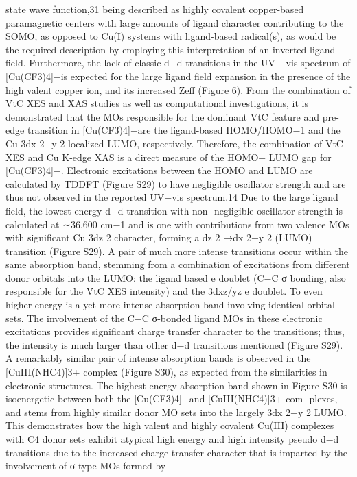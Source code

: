 \documentclass{article}
\begin{document}
state wave function,31 being described as highly covalent
copper-based paramagnetic centers with large amounts of
ligand character contributing to the SOMO, as opposed to
Cu(I) systems with ligand-based radical(s), as would be the
required description by employing this interpretation of an
inverted ligand ﬁeld.
Furthermore, the lack of classic d−d transitions in the UV−
vis spectrum of [Cu(CF3)4]−is expected for the large ligand
ﬁeld expansion in the presence of the high valent copper ion,
and its increased Zeff (Figure 6). From the combination of VtC
XES and XAS studies as well as computational investigations, it
is demonstrated that the MOs responsible for the dominant
VtC feature and pre-edge transition in [Cu(CF3)4]−are the
ligand-based HOMO/HOMO−1 and the Cu 3dx
2−y
2 localized
LUMO, respectively. Therefore, the combination of VtC XES
and Cu K-edge XAS is a direct measure of the HOMO−
LUMO gap for [Cu(CF3)4]−. Electronic excitations between
the HOMO and LUMO are calculated by TDDFT (Figure
S29) to have negligible oscillator strength and are thus not
observed in the reported UV−vis spectrum.14 Due to the large
ligand ﬁeld, the lowest energy d−d transition with non-
negligible oscillator strength is calculated at ∼36,600 cm−1 and
is one with contributions from two valence MOs with
signiﬁcant Cu 3dz
2 character, forming a dz
2 →dx
2−y
2
(LUMO) transition (Figure S29). A pair of much more
intense transitions occur within the same absorption band,
stemming from a combination of excitations from diﬀerent
donor orbitals into the LUMO: the ligand based e doublet
(C−C σ bonding, also responsible for the VtC XES intensity)
and the 3dxz/yz e doublet. To even higher energy is a yet more
intense absorption band involving identical orbital sets. The
involvement of the C−C σ-bonded ligand MOs in these
electronic excitations provides signiﬁcant charge transfer
character to the transitions; thus, the intensity is much larger
than other d−d transitions mentioned (Figure S29). A
remarkably similar pair of intense absorption bands is observed
in the [CuIII(NHC4)]3+ complex (Figure S30), as expected
from the similarities in electronic structures. The highest
energy absorption band shown in Figure S30 is isoenergetic
between both the [Cu(CF3)4]−and [CuIII(NHC4)]3+ com-
plexes, and stems from highly similar donor MO sets into the
largely 3dx
2−y
2 LUMO. This demonstrates how the high valent
and highly covalent Cu(III) complexes with C4 donor sets
exhibit atypical high energy and high intensity pseudo d−d
transitions due to the increased charge transfer character that is
imparted by the involvement of σ-type MOs formed by
\end{document}
